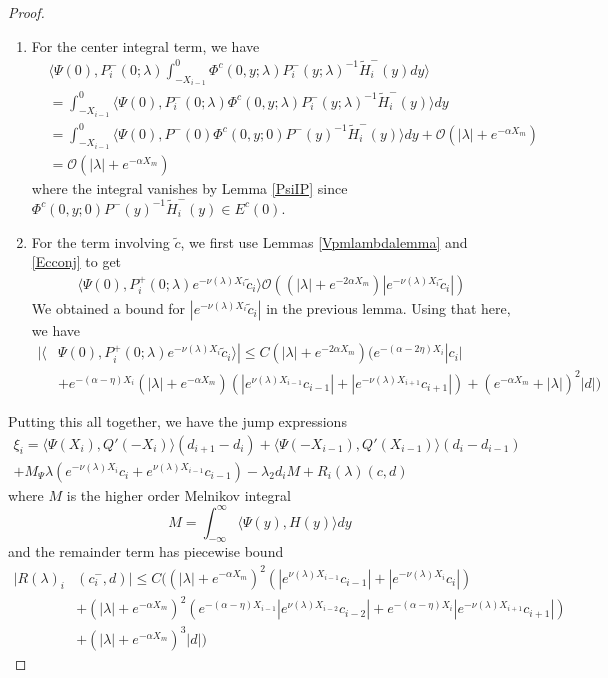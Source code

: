 \documentclass[thesis.tex]{subfiles}
\begin{document}
\begin{lemma}
\begin{proof}
\begin{enumerate}
\item For the center integral term, we have
\begin{align*}
&\langle \Psi(0), P_i^-(0; \lambda)
\int_{-X_{i-1}}^0 \Phi^c(0, y; \lambda) P_i^-(y; \lambda)^{-1} \tilde{H}_i^-(y) dy \rangle \\
&= \int_{-X_{i-1}}^0 \langle \Psi(0), P_i^-(0; \lambda) \Phi^c(0, y; \lambda) P_i^-(y; \lambda)^{-1} \tilde{H}_i^-(y) \rangle dy \\
&= \int_{-X_{i-1}}^0 \langle \Psi(0), P^-(0) \Phi^c(0, y; 0) P^-(y)^{-1} \tilde{H}_i^-(y) \rangle dy + \mathcal{O}(|\lambda| + e^{-\alpha X_m}) \\
&= \mathcal{O}(|\lambda| + e^{-\alpha X_m})
\end{align*}
where the integral vanishes by Lemma \ref{PsiIP} since $\Phi^c(0, y; 0) P^-(y)^{-1} \tilde{H}_i^-(y) \in E^c(0)$.

\item For the term involving $\tilde{c}$, we first use Lemmas \ref{Vpmlambdalemma} and \ref{Ecconj} to get
\begin{align*}
\langle \Psi(0), P_i^+(0; \lambda) e^{-\nu(\lambda) X_i}\tilde{c}_i \rangle \mathcal{O}((|\lambda| + e^{-2 \alpha X_m})|e^{-\nu(\lambda) X_i}\tilde{c}_i|)
\end{align*}
We obtained a bound for $|e^{-\nu(\lambda) X_i}\tilde{c}_i|$ in the previous lemma. Using that here, we have
\begin{align*}
|\langle &\Psi(0), P_i^+(0; \lambda) e^{-\nu(\lambda) X_i}\tilde{c}_i \rangle| \leq C (|\lambda| + e^{-2 \alpha X_m})\Big( e^{-(\alpha - 2\eta)X_i}|c_i| \\
&+ e^{-(\alpha-\eta) X_i} (|\lambda| + e^{-\alpha X_m})(|e^{\nu(\lambda)X_{i-1}} c_{i-1}| + |e^{-\nu(\lambda)X_{i+1}}c_{i+1}|) + (e^{-\alpha X_m} + |\lambda|)^2|d|  \Big)
\end{align*}

\end{enumerate}

Putting this all together, we have the jump expressions
\begin{align*}
\xi_i = \langle \Psi(X_i), Q'(-X_i) \rangle (d_{i+1} - d_i ) + \langle \Psi(-X_{i-1}), Q'(X_{i-1}) \rangle (d_i - d_{i-1} ) \\
+ M_\Psi \lambda( e^{-\nu(\lambda)X_i}c_i + e^{\nu(\lambda)X_{i-1}}c_{i-1})
- \lambda_2 d_i M + R_i(\lambda)(c, d)
\end{align*}
where $M$ is the higher order Melnikov integral
\[
M = \int_{-\infty}^\infty \langle \Psi(y), H(y) \rangle dy
\]
and the remainder term has piecewise bound
\begin{align*}
|R(\lambda)_i&(c_i^-, d)| \leq C \Big( (|\lambda| + e^{-\alpha X_m})^2(|e^{\nu(\lambda)X_{i-1}}c_{i-1}| + |e^{-\nu(\lambda)X_i}c_i|) \\
&+ (|\lambda| + e^{-\alpha X_m})^2(e^{-(\alpha - \eta) X_{i-1}} |e^{\nu(\lambda)X_{i-2}}c_{i-2}| + e^{-(\alpha - \eta) X_i} |e^{-\nu(\lambda)X_{i+1}}c_{i+1}|) \\
&+ (|\lambda| + e^{-\alpha X_m})^3 |d| \Big)
\end{align*}


\end{proof}
\end{lemma}
\end{document}
